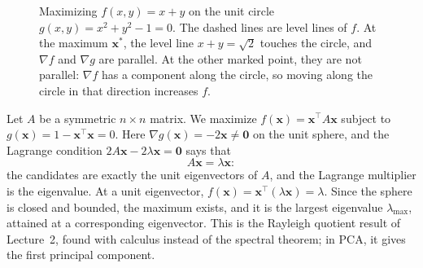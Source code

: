\begin{figure}[ht]
    \centering
    \caption{Maximizing $f(x, y) = x + y$ on the unit circle $g(x, y) = x^2 + y^2 - 1 = 0$. The dashed lines are level lines of $f$. At the maximum $\mathbf{x}^*$, the level line $x + y = \sqrt{2}$ touches the circle, and $\nabla f$ and $\nabla g$ are parallel. At the other marked point, they are not parallel: $\nabla f$ has a component along the circle, so moving along the circle in that direction increases $f$.}
    \label{L3-fig:lagrange}
\end{figure}

\begin{example}\label{L3-ex:lagrange-eigen}
    Let $A$ be a symmetric $n \times n$ matrix. We maximize $f(\mathbf{x}) = \mathbf{x}^\top A\mathbf{x}$ subject to $g(\mathbf{x}) = 1 - \mathbf{x}^\top\mathbf{x} = 0$. Here $\nabla g(\mathbf{x}) = -2\mathbf{x} \neq \mathbf{0}$ on the unit sphere, and the Lagrange condition $2A\mathbf{x} - 2\lambda\mathbf{x} = \mathbf{0}$ says that
    \[A\mathbf{x} = \lambda\mathbf{x}:\]
    the candidates are exactly the unit eigenvectors of $A$, and the Lagrange multiplier is the eigenvalue. At a unit eigenvector, $f(\mathbf{x}) = \mathbf{x}^\top(\lambda\mathbf{x}) = \lambda$. Since the sphere is closed and bounded, the maximum exists, and it is the largest eigenvalue $\lambda_{\max}$, attained at a corresponding eigenvector. This is the Rayleigh quotient result of Lecture~2, found with calculus instead of the spectral theorem; in PCA, it gives the first principal component.
\end{example}

